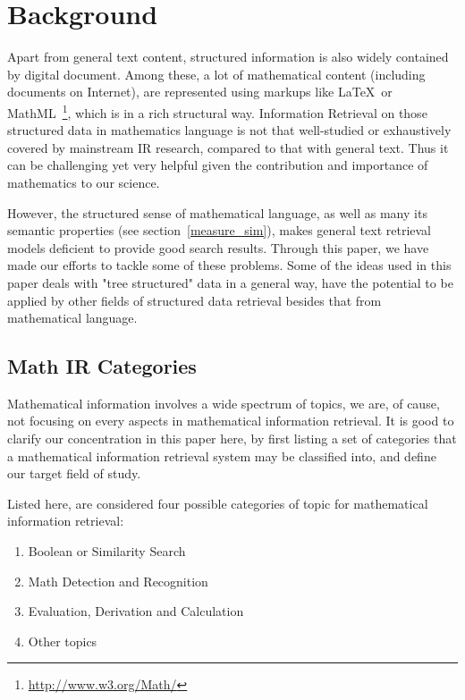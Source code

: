 \chapter{Background}
Apart from general text content, structured information is also widely contained by digital document. Among these, a lot of mathematical content (including documents on Internet), are represented using markups like \LaTeX\  or MathML~\footnote{\url{http://www.w3.org/Math/}}, which is in a rich structural way. 
Information Retrieval on those structured data in mathematics language is not that well-studied or exhaustively covered by mainstream IR research, compared to that with general text. 
Thus it can be challenging yet very helpful given the contribution and importance of mathematics to our science. 

However, the structured sense of mathematical language, as well as many its semantic properties (see section~\ref{measure_sim}), makes general text retrieval models deficient to provide good search results. Through this paper, we have made our efforts to tackle some of these problems. 
Some of the ideas used in this paper deals with "tree structured" data in a general way, have the potential to be applied by other fields of structured data retrieval besides that from mathematical language. 

\section{Math IR Categories}

Mathematical information involves a wide spectrum of topics, 
we are, of cause, not focusing on every aspects in mathematical information retrieval. 
It is good to clarify our concentration in this paper here, by first listing a set of categories that a mathematical information retrieval system may be classified into,
and define our target field of study.

\pagebreak
Listed here, are considered four possible categories of topic for mathematical information retrieval:

\begin{enumerate}
\item Boolean or Similarity Search
\item Math Detection and Recognition
\item Evaluation, Derivation and Calculation
\item Other topics 
\end{enumerate}

